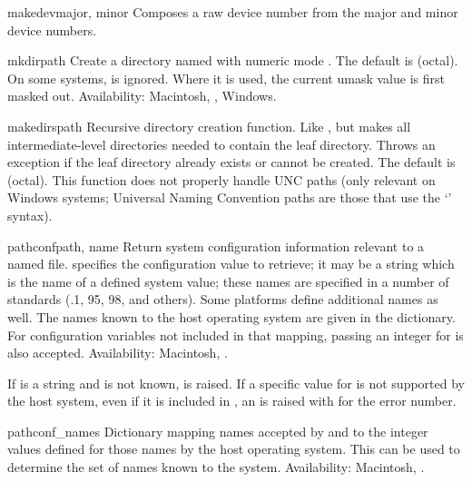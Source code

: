 \begin{funcdesc}{makedev}{major, minor}
Composes a raw device number from the major and minor device numbers.
\end{funcdesc}

\begin{funcdesc}{mkdir}{path}
Create a directory named  with numeric mode .
The default  is  (octal).  On some systems,
 is ignored.  Where it is used, the current umask value is
first masked out.
Availability: Macintosh, \UNIX, Windows.
\end{funcdesc}

\begin{funcdesc}{makedirs}{path}
Recursive directory creation function.
Like ,
but makes all intermediate-level directories needed to contain the
leaf directory.  Throws an  exception if the leaf
directory already exists or cannot be created.  The default 
is  (octal).  This function does not properly handle UNC
paths (only relevant on Windows systems; Universal Naming Convention
paths are those that use the `' syntax).
\end{funcdesc}

\begin{funcdesc}{pathconf}{path, name}
Return system configuration information relevant to a named file.
 specifies the configuration value to retrieve; it may be a
string which is the name of a defined system value; these names are
specified in a number of standards (\POSIX.1, \UNIX{} 95, \UNIX{} 98, and
others).  Some platforms define additional names as well.  The names
known to the host operating system are given in the
 dictionary.  For configuration variables not
included in that mapping, passing an integer for  is also
accepted.
Availability: Macintosh, \UNIX.

If  is a string and is not known,  is
raised.  If a specific value for  is not supported by the
host system, even if it is included in , an
 is raised with  for the
error number.
\end{funcdesc}

\begin{datadesc}{pathconf_names}
Dictionary mapping names accepted by  and
 to the integer values defined for those names
by the host operating system.  This can be used to determine the set
of names known to the system.
Availability: Macintosh, \UNIX.
\end{datadesc}

